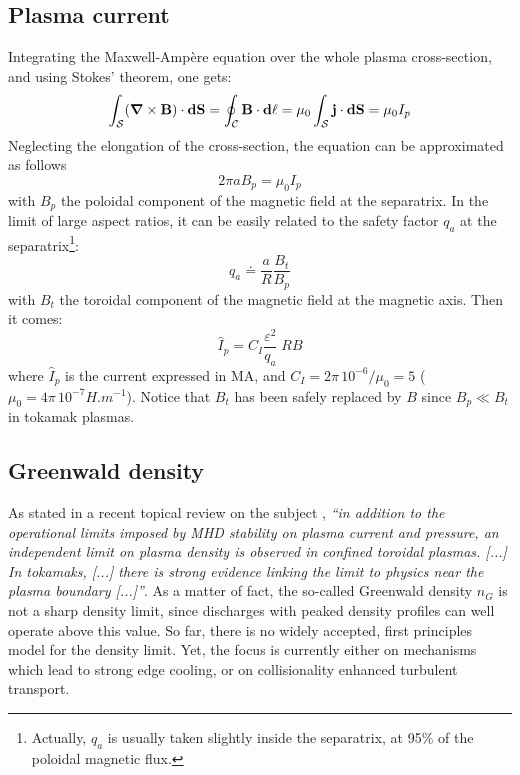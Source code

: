 \subsection{Plasma current}
Integrating the Maxwell-Amp\`ere equation over the whole plasma cross-section, and using Stokes' theorem, one gets:
\begin{equation}
\int_\mathcal{S} (\mbox{\boldmath${\nabla}$}\times {\mathbf B}) \cdot \mathbf{dS} = 
\oint_\mathcal{C} \mathbf{B} \cdot \mathbf{d\ell}
= \mu_0 \int_\mathcal{S} {\mathbf j} \cdot \mathbf{dS} = \mu_0 I_p
\end{equation}
Neglecting the elongation of the cross-section, the equation can be approximated as follows
$$
2\pi a B_p = \mu_0 I_p
$$
with $B_p$ the poloidal component of the magnetic field at the separatrix. In the limit of large aspect ratios, it can be easily related to the safety factor $q_a$ at the separatrix\footnote{Actually, $q_a$ is usually taken slightly inside the separatrix, at 95$\%$ of the poloidal magnetic flux.}:
\begin{equation}
q_a \doteq \frac{a}{R} \frac{B_t}{B_p} 
\end{equation}
with $B_t$ the toroidal component of the magnetic field at the magnetic axis. Then it comes:
\begin{equation}
\boxed{\hat I_p = C_I \frac{\varepsilon^2}{q_a} \; R B}
\label{eqn:plasma_current}
\end{equation}
where $\hat I_p$ is the current expressed in MA, and $C_I = 2\pi\, 10^{-6} /\mu_0 = 5$  ($\mu_0 = 4\pi\, 10^{-7} \si{H.m^{-1}}$).
Notice that $B_t$ has been safely replaced by $B$ since $B_p\ll B_t$ in tokamak plasmas. 

\subsection{Greenwald density}

As stated in a recent topical review on the subject \cite{Greenwald2002}, \emph{``in addition to the operational limits imposed by MHD stability on plasma current and pressure, an independent limit on plasma density is observed in confined toroidal plasmas. [...] In tokamaks, [...] there is strong evidence linking the limit to physics near the plasma boundary [...]''}. As a matter of fact, the so-called Greenwald density $n_G$ is not a sharp density limit, since discharges with peaked density profiles can well operate above this value. So far, there is no widely accepted, first principles model for the density limit. Yet, the focus is currently either on mechanisms which lead to strong edge cooling, or on collisionality enhanced turbulent transport.

